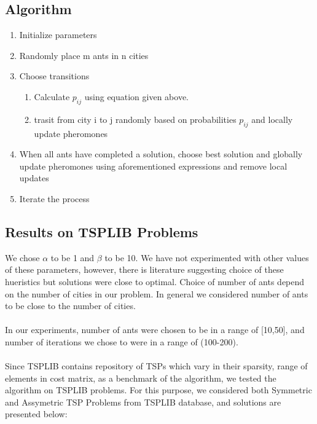 \documentclass[11pt, english]{article}
\begin{document}
\subsection{Algorithm}

\begin{enumerate}
	\item Initialize parameters
	\item Randomly place m ants in n cities
	\item Choose transitions
	\begin{enumerate}
		\item Calculate $p_{ij}$ using equation given above. 
		\item trasit from city {i} to {j} randomly based on probabilities $p_{ij}$ and locally update pheromones
	\end{enumerate}	 
	\item When all ants have completed a solution, choose best solution and globally update pheromones using aforementioned expressions and remove local updates
	\item Iterate the process
\end{enumerate}

\subsection{Results on TSPLIB Problems}
We chose $\alpha$ to be 1 and $\beta$ to be 10. We have not experimented with other values of these parameters, however, there is literature suggesting choice of these hueristics but solutions were close to optimal. Choice of number of ants depend on the number of cities in our problem. In general we considered number of ants to be close to the number of cities. \\ 
\\
In our experiments, number of ants were chosen to be in a range of [10,50], and number of iterations we chose to were in a range of (100-200).\\
\\
Since TSPLIB contains repository of TSPs which vary in their sparsity, range of elements in cost matrix, as a benchmark of the algorithm, we tested the algorithm on TSPLIB problems. For this purpose, we considered both Symmetric and Assymetric TSP Problems from TSPLIB database, and solutions are presented below:
\end{document}
